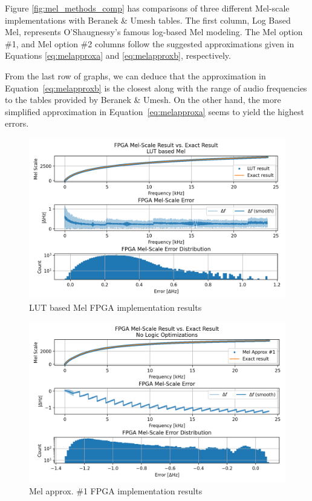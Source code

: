 Figure \ref{fig:mel_methods_comp} has comparisons of three different 
Mel-scale implementations with Beranek \& Umesh tables.
The first column, Log Based Mel, represents
O'Shaugnessy's famous log-based Mel modeling.
The Mel option \#1, and Mel option \#2 columns 
follow the suggested approximations
given in Equations \ref{eq:melapproxa} 
and \ref{eq:melapproxb}, respectively.

From the last row of graphs, we can deduce that the approximation
in Equation~\ref{eq:melapproxb} 
is the closest along with the range of audio frequencies
to the tables provided by Beranek \& Umesh.
On the other hand, the more simplified approximation 
in Equation~\ref{eq:melapproxa} seems 
to yield the highest errors.

\begin{figure}[H]
    \centering
    \includegraphics[width=\linewidth]{Scaling/images/mel_lut}
    \caption{LUT based Mel FPGA implementation results}\label{fig:mel_lut}
\end{figure}

\begin{figure}[H]
    \centering
    \includegraphics[width=\linewidth]{Scaling/images/mel_approx_no_opt}
    \caption{Mel approx. \#1 FPGA implementation results}\label{fig:mel_approx_no_opt}
\end{figure}

